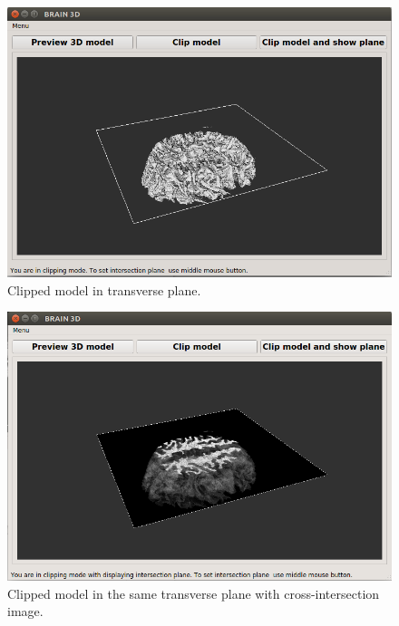 \begin{figure}[H]
\centering{}\includegraphics[scale=0.7]{figures/Module_11/11_test_5.png}\caption{Clipped model in transverse plane. \label{fig:figures/11_test_5}}
\end{figure}

\begin{figure}[H]
\centering{}\includegraphics[scale=0.7]{figures/Module_11/11_test_6.png}\caption{Clipped model in the same transverse plane with cross-intersection image. \label{fig:figures/11_test_6}}
\end{figure}


